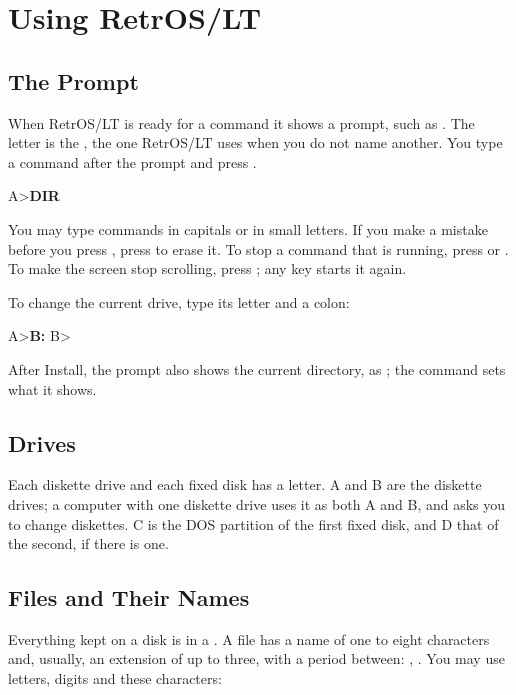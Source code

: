 \mwnewpart
\renewcommand\runningtitle{Section 3. Using RetrOS/LT}
\chapter{Using RetrOS/LT}
\sectioncontents

\section{The Prompt}

When RetrOS/LT is ready for a command it shows a prompt, such as
. The letter is the , the one RetrOS/LT uses
when you do not name another. You type a command after the prompt and
press .

\begin{dialogue}
A>\textbf{DIR}
\end{dialogue}

You may type commands in capitals or in small letters. If you make a
mistake before you press , press  to erase it. To
stop a command that is running, press  or .
To make the screen stop scrolling, press ; any key
starts it again.

To change the current drive, type its letter and a colon:

\begin{dialogue}
A>\textbf{B:}
B>
\end{dialogue}

After Install, the prompt also shows the current directory, as
; the  command sets what it shows.

\section{Drives}

Each diskette drive and each fixed disk has a letter. A and B are the
diskette drives; a computer with one diskette drive uses it as both A and
B, and asks you to change diskettes. C is the DOS partition of the first
fixed disk, and D that of the second, if there is one.

\section{Files and Their Names}

Everything kept on a disk is in a . A file has a name of one to
eight characters and, usually, an extension of up to three, with a period
between: , . You may use letters,
digits and these characters:

